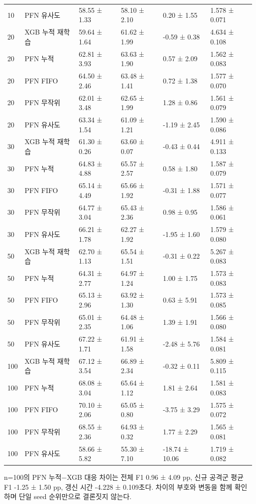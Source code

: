 \begin{longtable}
{}10 & PFN 유사도 & 58.55 ± 1.33 & 58.10 ± 2.10 & 0.20 ± 1.55 & 1.578 ± 0.071 \\
{}20 & XGB 누적 재학습 & 59.64 ± 1.64 & 61.62 ± 1.99 & -0.59 ± 0.38 & 4.634 ± 0.108 \\
{}20 & PFN 누적 & 62.81 ± 3.93 & 63.63 ± 1.90 & 0.57 ± 2.09 & 1.562 ± 0.083 \\
{}20 & PFN FIFO & 64.50 ± 2.46 & 63.48 ± 1.41 & 0.72 ± 1.38 & 1.577 ± 0.070 \\
{}20 & PFN 무작위 & 62.01 ± 3.48 & 62.65 ± 1.99 & 1.28 ± 0.86 & 1.561 ± 0.079 \\
{}20 & PFN 유사도 & 63.34 ± 1.54 & 61.09 ± 1.21 & -1.19 ± 2.45 & 1.590 ± 0.086 \\
{}30 & XGB 누적 재학습 & 61.30 ± 0.26 & 63.60 ± 0.07 & -0.43 ± 0.44 & 4.911 ± 0.133 \\
{}30 & PFN 누적 & 64.83 ± 4.88 & 65.57 ± 2.57 & 0.58 ± 1.80 & 1.587 ± 0.079 \\
{}30 & PFN FIFO & 65.14 ± 4.49 & 65.66 ± 1.92 & -0.31 ± 1.88 & 1.571 ± 0.077 \\
{}30 & PFN 무작위 & 64.77 ± 3.04 & 65.43 ± 2.36 & 0.98 ± 0.95 & 1.586 ± 0.061 \\
{}30 & PFN 유사도 & 66.21 ± 1.78 & 62.27 ± 1.92 & -1.95 ± 1.60 & 1.579 ± 0.080 \\
{}50 & XGB 누적 재학습 & 62.70 ± 1.13 & 65.54 ± 1.51 & -0.31 ± 0.22 & 5.267 ± 0.083 \\
{}50 & PFN 누적 & 64.31 ± 2.77 & 64.97 ± 1.24 & 1.00 ± 1.75 & 1.573 ± 0.083 \\
{}50 & PFN FIFO & 65.13 ± 2.96 & 63.92 ± 1.30 & 0.63 ± 5.91 & 1.573 ± 0.085 \\
{}50 & PFN 무작위 & 65.01 ± 2.35 & 64.48 ± 1.06 & 1.39 ± 1.91 & 1.566 ± 0.080 \\
{}50 & PFN 유사도 & 67.22 ± 1.71 & 61.91 ± 1.58 & -2.48 ± 5.76 & 1.584 ± 0.081 \\
{}100 & XGB 누적 재학습 & 67.12 ± 3.54 & 66.89 ± 2.34 & -0.32 ± 0.11 & 5.809 ± 0.115 \\
{}100 & PFN 누적 & 68.08 ± 3.04 & 65.64 ± 1.12 & 1.81 ± 2.64 & 1.581 ± 0.083 \\
{}100 & PFN FIFO & 70.10 ± 2.06 & 65.05 ± 0.80 & -3.75 ± 3.29 & 1.575 ± 0.072 \\
{}100 & PFN 무작위 & 68.55 ± 2.36 & 64.93 ± 0.32 & 1.77 ± 2.29 & 1.565 ± 0.081 \\
{}100 & PFN 유사도 & 58.66 ± 5.82 & 55.30 ± 7.10 & -18.74 ± 10.06 & 1.719 ± 0.082 \\
\bottomrule
\end{longtable}
\endgroup
n=\allowbreak{}100의 PFN 누적−XGB 대응 차이는 전체 F1 0.96 ± 4.09 pp, 신규 공격군 평균 F1 -1.25 ± 1.50 pp, 갱신 시간 -4.228 ± 0.109초다. 차이의 부호와 변동을 함께 확인하며 단일 seed 순위만으로 결론짓지 않는다.

